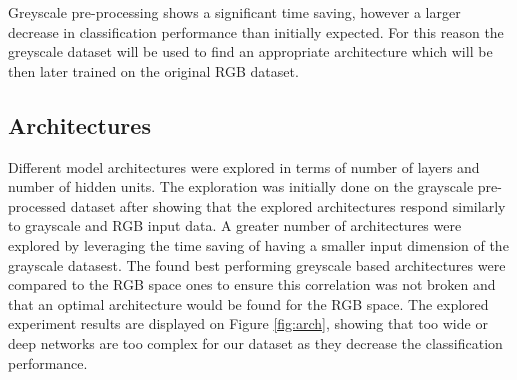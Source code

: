 \documentclass[12pt]{article}
\begin{document}
Greyscale pre-processing shows a significant time saving, however a larger decrease in classification performance than initially expected. For this reason the greyscale dataset will be used to find an appropriate architecture which will be then later trained on the original RGB dataset.

\subsection*{Architectures}

Different model architectures were explored in terms of number of layers and number of hidden units. The exploration was initially done on the grayscale pre-processed dataset after showing that the explored architectures respond similarly to grayscale and RGB input data. A greater number of architectures were explored by leveraging the time saving of having a smaller input dimension of the grayscale datasest. The found best performing greyscale based architectures were compared to the RGB space ones to ensure this correlation was not broken and that an optimal architecture would be found for the RGB space. The explored experiment results are displayed on Figure \ref{fig:arch}, showing that too wide or deep networks are too complex for our dataset as they decrease the classification performance.
\end{document}
